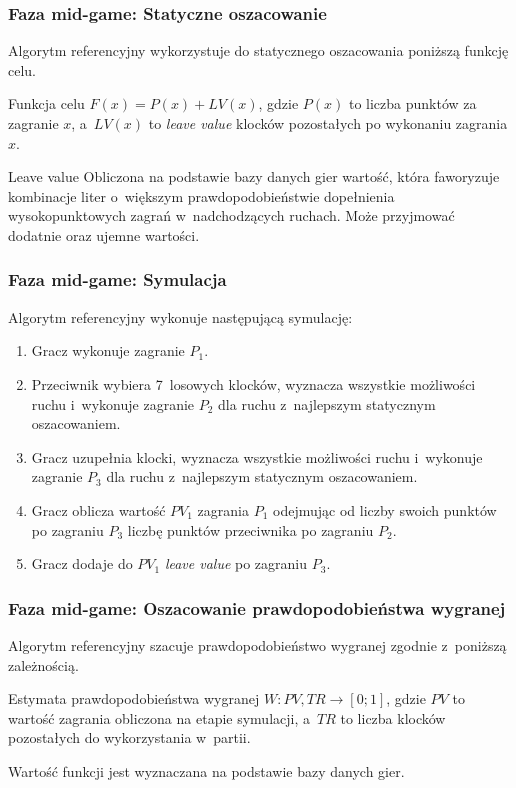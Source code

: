 \documentclass[10pt,a4paper]{beamer}
\begin{document}
\begin{frame}
	\frametitle{Faza mid-game: Statyczne oszacowanie}
	
	Algorytm referencyjny wykorzystuje do statycznego oszacowania poniższą funkcję celu.

	\begin{block}{Funkcja celu}	
		$F(x) = P(x) + LV(x)$,
		\vskip5pt
		gdzie $P(x)$ to liczba punktów za zagranie $x$, a~$LV(x)$ to \emph{leave value} klocków pozostałych po wykonaniu zagrania $x$. 
	\end{block}

	\begin{block}{Leave value}	
		Obliczona na podstawie bazy danych gier wartość, która faworyzuje kombinacje liter o~większym prawdopodobieństwie dopełnienia wysokopunktowych zagrań w~nadchodzących ruchach. Może przyjmować dodatnie oraz ujemne wartości.
	\end{block}
\end{frame}

\begin{frame}
	\frametitle{Faza mid-game: Symulacja}

	Algorytm referencyjny wykonuje następującą symulację:

	\begin{enumerate}
		\item Gracz wykonuje zagranie $P_{1}$.
		\item Przeciwnik wybiera 7~losowych klocków, wyznacza wszystkie możliwości ruchu i~wykonuje zagranie $P_{2}$ dla ruchu z~najlepszym statycznym oszacowaniem.
		\item Gracz uzupełnia klocki, wyznacza wszystkie możliwości ruchu i~wykonuje zagranie $P_{3}$ dla ruchu z~najlepszym statycznym oszacowaniem.
		\item Gracz oblicza wartość $PV_{1}$ zagrania $P_{1}$ odejmując od liczby swoich punktów po zagraniu $P_{3}$ liczbę punktów przeciwnika po zagraniu $P_{2}$.
		\item Gracz dodaje do $PV_{1}$ \emph{leave value} po zagraniu $P_{3}$.
	\end{enumerate}
\end{frame}

\begin{frame}
	\frametitle{Faza mid-game: Oszacowanie prawdopodobieństwa wygranej}
	
	Algorytm referencyjny szacuje prawdopodobieństwo wygranej zgodnie z~poniższą zależnością.

	\begin{block}{Estymata prawdopodobieństwa wygranej}	
		$W: PV, TR \rightarrow [0;1]$,
		\vskip5pt
		gdzie $PV$ to wartość zagrania obliczona na etapie symulacji, a~$TR$ to liczba klocków pozostałych do wykorzystania w~partii.
	\end{block}

	Wartość funkcji jest wyznaczana na podstawie bazy danych gier.
\end{frame}
\end{document}
